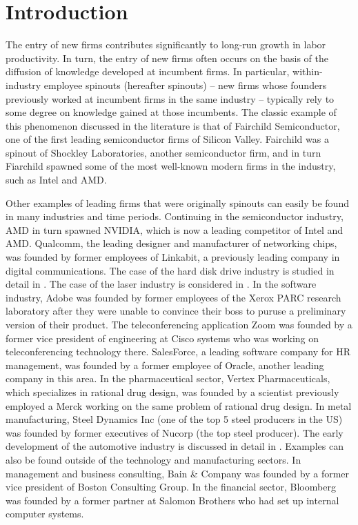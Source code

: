 \documentclass[11pt,english]{article}
\begin{document}
\section{Introduction}

The entry of new firms contributes significantly to long-run growth in labor productivity. In turn, the entry of new firms often occurs on the basis of the diffusion of knowledge developed at incumbent firms. In particular, within-industry employee spinouts (hereafter spinouts) -- new firms whose founders previously worked at incumbent firms in the same industry -- typically rely to some degree on knowledge gained at those incumbents. The classic example of this phenomenon discussed in the literature is that of Fairchild Semiconductor, one of the first leading semiconductor firms of Silicon Valley. Fairchild was a spinout of Shockley Laboratories, another semiconductor firm, and in turn Fiarchild spawned some of the most well-known modern firms in the industry, such as Intel and AMD. 

Other examples of leading firms that were originally spinouts can easily be found in many industries and time periods. Continuing in the semiconductor industry, AMD in turn spawned NVIDIA, which is now a leading competitor of Intel and AMD. Qualcomm, the leading designer and manufacturer of networking chips, was founded by former employees of Linkabit, a previously leading company in digital communications. The case of the hard disk drive industry is studied in detail in \cite{franco_spin-outs_2006}. The case of the laser industry is considered in \cite{klepper_entry_2005}. In the software industry, Adobe was founded by former employees of the Xerox PARC research laboratory after they were unable to convince their boss to puruse a preliminary version of their product. The teleconferencing application Zoom was founded by a former vice president of engineering at Cisco systems who was working on teleconferencing technology there. SalesForce, a leading software company for HR management, was founded by a former employee of Oracle, another leading company in this area. In the pharmaceutical sector, Vertex Pharmaceuticals, which specializes in rational drug design, was founded by a scientist previously employed a Merck working on the same problem of rational drug design. In metal manufacturing, Steel Dynamics Inc (one of the top 5 steel producers in the US) was founded by former executives of Nucorp (the top steel producer). The early development of the automotive industry is discussed in detail in \cite{klepper_disagreements_2007}. Examples can also be found outside of the technology and manufacturing sectors. In management and business consulting, Bain \& Company was founded by a former vice president of Boston Consulting Group. In the financial sector, Bloomberg was founded by a former partner at Salomon Brothers who had set up internal computer systems. 
\end{document}
